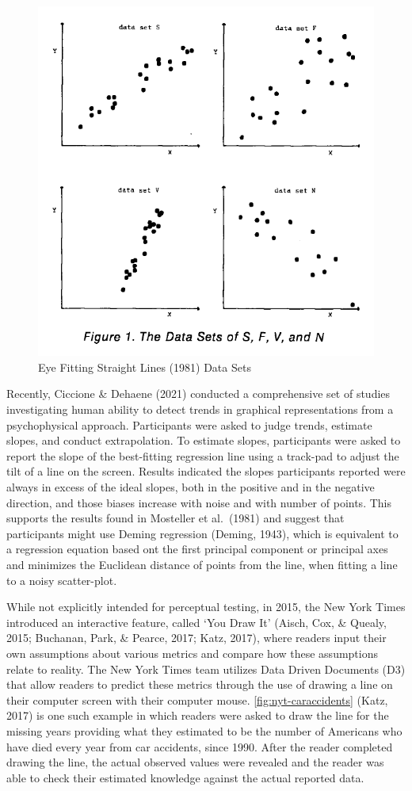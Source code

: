 \documentclass[print]{nuthesis}
\begin{document}
\begin{figure}[tbp]

{\centering \includegraphics[width=0.7\linewidth,]{images/02-you-draw-it/eyefitting-straight-lines-plots} 

}

\caption{Eye Fitting Straight Lines (1981) Data Sets}\label{fig:mosteller-eyefitting-plot}
\end{figure}

Recently, Ciccione \& Dehaene (2021) conducted a comprehensive set of studies investigating human ability to detect trends in graphical representations from a psychophysical approach.
Participants were asked to judge trends, estimate slopes, and conduct extrapolation.
To estimate slopes, participants were asked to report the slope of the best-fitting regression line using a track-pad to adjust the tilt of a line on the screen.
Results indicated the slopes participants reported were always in excess of the ideal slopes, both in the positive and in the negative direction, and those biases increase with noise and with number of points.
This supports the results found in Mosteller et al.~(1981) and suggest that participants might use Deming regression (Deming, 1943), which is equivalent to a regression equation based ont the first principal component or principal axes and minimizes the Euclidean distance of points from the line, when fitting a line to a noisy scatter-plot.

While not explicitly intended for perceptual testing, in 2015, the New York Times introduced an interactive feature, called `You Draw It' (Aisch, Cox, \& Quealy, 2015; Buchanan, Park, \& Pearce, 2017; Katz, 2017), where readers input their own assumptions about various metrics and compare how these assumptions relate to reality.
The New York Times team utilizes Data Driven Documents (D3) that allow readers to predict these metrics through the use of drawing a line on their computer screen with their computer mouse.
\cref{fig:nyt-caraccidents} (Katz, 2017) is one such example in which readers were asked to draw the line for the missing years providing what they estimated to be the number of Americans who have died every year from car accidents, since 1990.
After the reader completed drawing the line, the actual observed values were revealed and the reader was able to check their estimated knowledge against the actual reported data.
\end{document}
